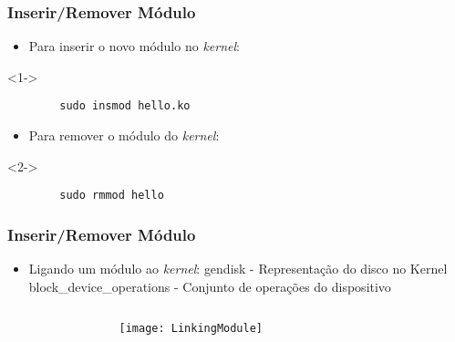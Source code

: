 \begin{frame}[fragile]
	\frametitle{Inserir/Remover Módulo}
	
	\begin{itemize}
		\item<1-> Para inserir o novo módulo no \textit{kernel}:
	\end{itemize}

	\lstset{language=bash}

	\begin{block}<1->{}
	\begin{lstlisting}
		sudo insmod hello.ko
	\end{lstlisting}
	\end{block}

	\begin{itemize}
		\item<2-> Para remover o módulo do \textit{kernel}:
	\end{itemize}

	\begin{block}<2->{}
	\begin{lstlisting}
		sudo rmmod hello
	\end{lstlisting}
	\end{block}

\end{frame}


\begin{frame}
	\frametitle{Inserir/Remover Módulo}
	\begin{itemize}
		\item<1-> Ligando um módulo ao \textit{kernel}:
		 {gendisk - Representação do disco no Kernel}
		 {block_device_operations - Conjunto de operações do dispositivo}
	\end{itemize}
	\begin{columns}[T]
		\begin{column}{.05\textwidth}
		\end{column}
		\begin{column}{.8\textwidth}
			\uncover<1-> {\texttt{[image: LinkingModule]} \tiny{\cite{LinuxDrivers}}}
		\end{column}
		\begin{column}{.15\textwidth}
		\end{column}
	\end{columns}
\end{frame}


